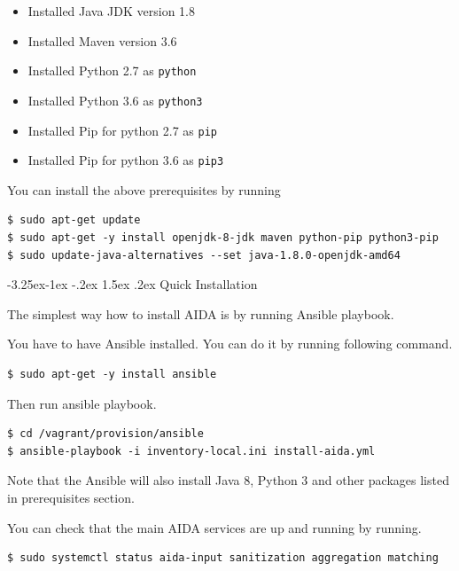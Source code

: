 \documentclass[a4paper]{article} %
\makeatletter
\renewcommand\subsection{\@startsection{subsection}{2}{\z@}%
                   {-3.25ex\@plus -1ex \@minus -.2ex}%
                   {1.5ex \@plus .2ex}%
                   {\normalfont\sffamily\large\bfseries\color{projectcolor}}}
\makeatother
\begin{document}
\begin{itemize}
    \item Installed Java JDK version 1.8
    \item Installed Maven version 3.6
    \item Installed Python 2.7 as \texttt{python}
    \item Installed Python 3.6 as \texttt{python3}
    \item Installed Pip for python 2.7 as \texttt{pip}
    \item Installed Pip for python 3.6 as \texttt{pip3}
\end{itemize}

You can install the above prerequisites by running

\begin{lstlisting}
$ sudo apt-get update
$ sudo apt-get -y install openjdk-8-jdk maven python-pip python3-pip
$ sudo update-java-alternatives --set java-1.8.0-openjdk-amd64
\end{lstlisting}



\subsection{Quick Installation}

The simplest way how to install AIDA is by running Ansible playbook.

You have to have Ansible installed. You can do it by running following command.

\begin{lstlisting}
$ sudo apt-get -y install ansible
\end{lstlisting}

Then run ansible playbook.

\begin{lstlisting}
$ cd /vagrant/provision/ansible
$ ansible-playbook -i inventory-local.ini install-aida.yml
\end{lstlisting}

Note that the Ansible will also install Java 8, Python 3 and other packages listed in prerequisites section.

You can check that the main AIDA services are up and running by running.
\begin{lstlisting}
$ sudo systemctl status aida-input sanitization aggregation matching
\end{lstlisting}
\end{document}
